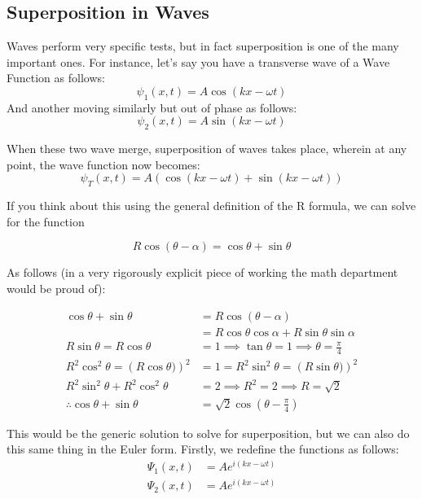 \documentclass[a4paper,12pt,oneside]{book}
\begin{document}
\subsection{Superposition in Waves}

Waves perform very specific tests, but in fact superposition is one of the many important ones. For instance, let's say you have a transverse wave of a Wave Function as follows:
\[ \psi_1(x, t) = A \cos(kx - \omega t) \]
And another moving similarly but out of phase as follows:
\[ \psi_2(x, t) = A \sin(kx - \omega t) \]

When these two wave merge, superposition of waves takes place, wherein at any point, the wave function now becomes:
\[ \psi_T(x, t) = A \left(\cos(kx - \omega t) + \sin(kx - \omega t) \right) \]

If you think about this using the general definition of the R formula, we can solve for the function 

\[R \cos(\theta - \alpha) = \cos\theta + \sin\theta \]

As follows (in a very rigorously explicit piece of working the math department would be proud of):

\begin{align*}
    \cos\theta + \sin\theta &= R \cos(\theta - \alpha)  \\
    &= R \cos\theta\cos\alpha + R \sin\theta \sin\alpha \\
    R \sin\theta = R \cos\theta &= 1 \implies \tan\theta = 1 \implies \theta = \frac{\pi}{4} \\
    R^2\cos^2\theta = \left(R\cos\theta)\right)^2 &= 1 = R^2\sin^2\theta = \left(R\sin\theta)\right)^2 \\
    R^2\sin^2\theta + R^2\cos^2\theta  &= 2 \implies R^2 = 2 \implies R = \sqrt{2} \\
    \therefore \cos\theta + \sin\theta &= \sqrt{2} \cos \left(\theta - \frac{\pi}{4} \right) 
\end{align*}

This would be the generic solution to solve for superposition, but we can also do this same thing in the Euler form. Firstly, we redefine the functions as follows:
\begin{align*}
    \Psi_1(x, t) &= A e^{i \left(kx - \omega t \right)} \\
    \Psi_2(x, t) &= A e^{i \left(kx - \omega t \right)} \\
\end{align*}
\end{document}
